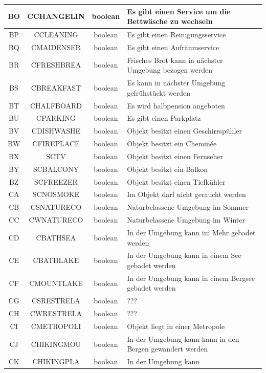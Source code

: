 \begin{longtable}{ | c | c | c | L{7.5cm} | }
	BO & CCHANGELIN & boolean & Es gibt einen Service um die Bettwäsche zu wechseln \\ \hline 
	BP & CCLEANING & boolean & Es gibt einen Reinigungsservice \\ \hline 
	BQ & CMAIDENSER & boolean & Es gibt einen Aufräumservice \\ \hline 
	BR & CFRESHBREA & boolean & Frisches Brot kann in nächster Umgebung bezogen werden \\ \hline 
	BS & CBREAKFAST & boolean & Es kann in nächster Umgebung gefrühstückt werden \\ \hline 
	BT & CHALFBOARD & boolean & Es wird halbpension angeboten \\ \hline 
	BU & CPARKING & boolean & Es gibt einen Parkplatz \\ \hline 
	BV & CDISHWASHE & boolean & Objekt besitzt einen Geschirrspühler \\ \hline 
	BW & CFIREPLACE & boolean & Objekt besitzt ein Cheminée \\ \hline 
	BX & SCTV & boolean & Objekt besitzt einen Fernseher \\ \hline 
	BY & SCBALCONY & boolean & Objekt besitzt ein Balkon \\ \hline 
	BZ & SCFREEZER & boolean & Objekt besitzt einen Tiefkühler \\ \hline 
	CA & SCNOSMOKE & boolean & Im Objekt darf nicht geraucht werden \\ \hline 
	CB & CSNATURECO & boolean & Naturbelassene Umgebung im Sommer \\ \hline 
	CC & CWNATURECO & boolean & Naturbelassene Umgebung im Winter \\ \hline 
	CD & CBATHSEA & boolean & In der Umgebung kann im Mehr gebadet werden \\ \hline 
	CE & CBATHLAKE & boolean & In der Umgebung kann in einem See gebadet werden \\ \hline 
	CF & CMOUNTLAKE & boolean & In der Umgebung kann in einem Bergsee gebadet werden \\ \hline 
	CG & CSRESTRELA & boolean & ??? \\ \hline 
	CH & CWRESTRELA & boolean & ??? \\ \hline 
	CI & CMETROPOLI & boolean & Objekt liegt in einer Metropole \\ \hline 
	CJ & CHIKINGMOU & boolean & In der Umgebung kann kann in den Bergen gewandert werden \\ \hline 
	CK & CHIKINGPLA & boolean & In der Umgebung kann  \\ \hline 

\end{longtable}
